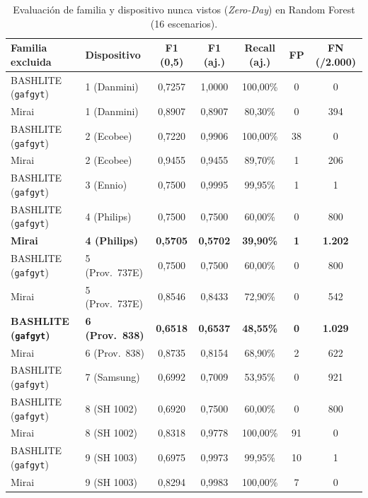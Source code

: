 \documentclass[11pt,a4paper]{article}
\begin{document}
\begin{table}[H]
\centering\scriptsize
\caption{Evaluación de familia y dispositivo nunca vistos (\textit{Zero-Day}) en Random Forest (16 escenarios).}
\label{tab:zeroday}
\begin{tabularx}{\textwidth}{>{\raggedright\arraybackslash}X l c c c c c}
\toprule
\textbf{Familia excluida} & \textbf{Dispositivo} & \textbf{F1 (0,5)} & \textbf{F1 (aj.)} & \textbf{Recall (aj.)} & \textbf{FP} & \textbf{FN (/2.000)} \\
\midrule
BASHLITE (\texttt{gafgyt}) & 1 (Danmini) & 0,7257 & 1,0000 & 100,00\% & 0 & 0 \\
Mirai & 1 (Danmini) & 0,8907 & 0,8907 & 80,30\% & 0 & 394 \\
BASHLITE (\texttt{gafgyt}) & 2 (Ecobee) & 0,7220 & 0,9906 & 100,00\% & 38 & 0 \\
Mirai & 2 (Ecobee) & 0,9455 & 0,9455 & 89,70\% & 1 & 206 \\
BASHLITE (\texttt{gafgyt}) & 3 (Ennio) & 0,7500 & 0,9995 & 99,95\% & 1 & 1 \\
BASHLITE (\texttt{gafgyt}) & 4 (Philips) & 0,7500 & 0,7500 & 60,00\% & 0 & 800 \\
\textbf{Mirai} & \textbf{4 (Philips)} & \textbf{0,5705} & \textbf{0,5702} & \textbf{39,90\%} & \textbf{1} & \textbf{1.202} \\
BASHLITE (\texttt{gafgyt}) & 5 (Prov.\ 737E) & 0,7500 & 0,7500 & 60,00\% & 0 & 800 \\
Mirai & 5 (Prov.\ 737E) & 0,8546 & 0,8433 & 72,90\% & 0 & 542 \\
\textbf{BASHLITE (\texttt{gafgyt})} & \textbf{6 (Prov.\ 838)} & \textbf{0,6518} & \textbf{0,6537} & \textbf{48,55\%} & \textbf{0} & \textbf{1.029} \\
Mirai & 6 (Prov.\ 838) & 0,8735 & 0,8154 & 68,90\% & 2 & 622 \\
BASHLITE (\texttt{gafgyt}) & 7 (Samsung) & 0,6992 & 0,7009 & 53,95\% & 0 & 921 \\
BASHLITE (\texttt{gafgyt}) & 8 (SH 1002) & 0,6920 & 0,7500 & 60,00\% & 0 & 800 \\
Mirai & 8 (SH 1002) & 0,8318 & 0,9778 & 100,00\% & 91 & 0 \\
BASHLITE (\texttt{gafgyt}) & 9 (SH 1003) & 0,6975 & 0,9973 & 99,95\% & 10 & 1 \\
Mirai & 9 (SH 1003) & 0,8294 & 0,9983 & 100,00\% & 7 & 0 \\
\bottomrule
\end{tabularx}
\end{table}
\end{document}
